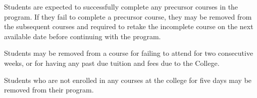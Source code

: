 Students are expected to successfully complete any precursor courses in the program.
If they fail to complete a precursor course, they may be removed from the subsequent
courses and required to retake the incomplete course on the next available date before
continuing with the program.
\par
\bigskip
Students may be removed from a course for failing to attend for two consecutive weeks,
or for having any past due tuition and fees due to the College.
\par
\bigskip
Students who are not enrolled in any courses at the college for five days may be removed from their program.
